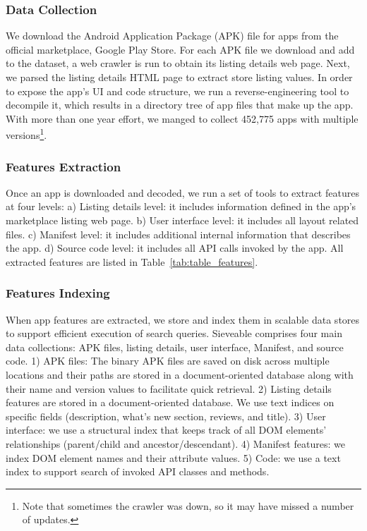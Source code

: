 \subsubsection{Data Collection}
We download the Android Application Package (APK) file for apps from the official marketplace, Google Play Store.
For each APK file we download and add to the dataset, a web crawler is run to obtain its listing details web page.
Next, we parsed the listing details HTML page to extract store listing values.
In order to expose the app's UI and code structure, we run a reverse-engineering tool to decompile it, which results in a directory tree of app files that make up the app. 
With more than one year effort, we manged to collect 452,775 apps with multiple versions\footnote{Note that sometimes the crawler was down, so it may have missed a number of updates.}.

\subsubsection{Features Extraction}
Once an app is downloaded and decoded, we run a set of tools to extract features at four levels:
a) Listing details level: it includes information defined in the app's marketplace listing web page.
b) User interface level: it includes all layout related files.
c) Manifest level: it includes additional internal information that describes the app.
d) Source code level: it includes all API calls invoked by the app.
All extracted features are listed in Table~\ref{tab:table_features}.

\subsubsection{Features Indexing}
When app features are extracted, we store and index them in scalable data stores to support efficient execution of search queries.
Sieveable comprises four main data collections: APK files, listing details, user interface, Manifest, and source code.
1) APK files: The binary APK files are saved on disk across multiple locations and their paths are stored in a document-oriented database along with their name and version values to facilitate quick retrieval.
2) Listing details features are stored in a document-oriented database.
We use text indices on specific fields (description, what's new section, reviews, and title).
3) User interface: we use a structural index that keeps track of all DOM elements' relationships (parent/child and ancestor/descendant).
4) Manifest features: we index DOM element names and their attribute values.
5) Code: we use a text index to support search of invoked API classes and methods.

